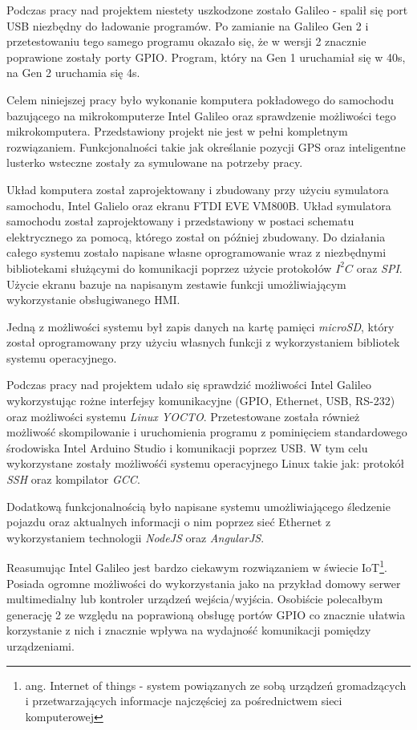 \documentclass{xmgr}
\begin{document}
Podczas pracy nad projektem niestety uszkodzone zostało Galileo - spalił się port USB niezbędny do ładowanie programów. Po zamianie na Galileo Gen 2 i przetestowaniu tego samego programu okazało się, że w wersji 2 znacznie poprawione zostały porty GPIO. Program, który na Gen 1 uruchamiał się w 40s, na Gen 2 uruchamia się 4s.

\summary
Celem niniejszej pracy było wykonanie komputera pokładowego do samochodu bazującego na mikrokomputerze Intel Galileo oraz sprawdzenie możliwości tego mikrokomputera. Przedstawiony projekt nie jest w pełni kompletnym rozwiązaniem. Funkcjonalności takie jak określanie pozycji GPS oraz inteligentne lusterko wsteczne zostały za symulowane na potrzeby pracy.

Układ komputera został zaprojektowany i zbudowany przy użyciu symulatora samochodu, Intel Galielo oraz ekranu FTDI EVE VM800B. Układ symulatora samochodu został zaprojektowany i przedstawiony w postaci schematu elektrycznego za pomocą, którego został on później zbudowany. Do działania całego systemu zostało napisane własne oprogramowanie wraz z niezbędnymi bibliotekami służącymi do komunikacji poprzez użycie protokołów $I^2C$ oraz \emph{SPI}. Użycie ekranu bazuje na napisanym zestawie funkcji umożliwiającym wykorzystanie obsługiwanego HMI.

Jedną z możliwości systemu był zapis danych na kartę pamięci \emph{microSD}, który został oprogramowany przy użyciu własnych funkcji z wykorzystaniem bibliotek systemu operacyjnego. 

Podczas pracy nad projektem udało się sprawdzić możliwości Intel Galileo wykorzystując rożne interfejsy komunikacyjne (GPIO, Ethernet, USB, RS-232) oraz możliwości systemu \emph{Linux YOCTO}. Przetestowane została również możliwość skompilowanie i uruchomienia programu z pominięciem standardowego środowiska Intel Arduino Studio i komunikacji poprzez USB. W tym celu wykorzystane zostały możliwośći systemu operacyjnego Linux takie jak: protokół \emph{SSH} oraz kompilator \emph{GCC}. 

Dodatkową funkcjonalnością było napisane systemu umożliwiającego śledzenie pojazdu oraz aktualnych informacji o nim poprzez sieć Ethernet z wykorzystaniem technologii \emph{NodeJS} oraz \emph{AngularJS}.

Reasumując Intel Galileo jest bardzo ciekawym rozwiązaniem w świecie IoT\footnote{ang. Internet of things - system powiązanych ze sobą urządzeń gromadzących i przetwarzających informacje najczęściej za pośrednictwem sieci komputerowej}. Posiada ogromne możliwości do wykorzystania jako na przykład domowy serwer multimedialny lub kontroler urządzeń wejścia/wyjścia. Osobiście polecałbym generację 2 ze względu na poprawioną obsługę portów GPIO co znacznie ułatwia korzystanie z nich i znacznie wpływa na wydajność komunikacji pomiędzy urządzeniami.
\end{document}
